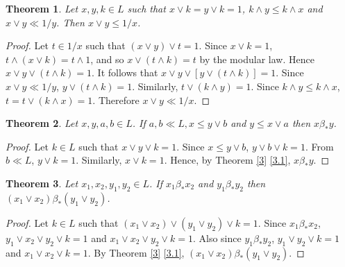 \documentclass[a4paper,12pt]{article}
\newtheorem{theorem}{Theorem}[section]
\numberwithin{equation}{section}
\begin{document}

\begin{theorem}\label{16}
  Let $ x,y,k \in L $ such that $ x \vee k = y \vee k = 1 $, $ k \wedge y \leq k \wedge x $ and $ x \vee y \ll 1/y $. 
  Then $ x \vee y \leq 1/x $.
\end{theorem}

\begin{proof}
  Let $ t \in 1/x $ such that $ ( x \vee y ) \vee t = 1 $. Since $ x \vee k = 1 $, $ t \wedge ( x \vee k ) = t \wedge 1 $, 
  and so $ x \vee ( t \wedge k ) = t $ by the modular law. Hence $ x \vee y \vee ( t \wedge k ) = 1 $. 
  It follows that $ x \vee y \vee \left[ y \vee ( t \wedge k ) \right] = 1 $. Since $ x \vee y \ll 1/y $, 
  $ y \vee ( t \wedge k ) = 1 $. Similarly, $ t \vee ( k \wedge y ) = 1 $. 
  Since $ k \wedge y \leq k \wedge x $, $ t = t \vee ( k \wedge x ) = 1 $. Therefore $ x \vee y \ll 1/x $.
\end{proof}

\begin{theorem}\label{17}
  Let $x,y,a,b \in L $. If $ a,b \ll L, x \leq y \vee b $ and $ y \leq x \vee a $ then $ x \beta_* y $.
\end{theorem}

\begin{proof}
  Let $ k \in L $ such that $ x \vee y \vee k = 1 $. Since $ x \leq y \vee b $, $ y \vee b \vee k = 1 $. 
  From $ b \ll L $, $ y \vee k = 1 $. Similarly, $ x \vee k = 1 $. 
  Hence, by Theorem \ref{3} \ref{3.1}, $ x \beta_* y $.
\end{proof}


\begin{theorem}\label{18}
  Let $ x_1,x_2,y_1,y_2 \in L $. If $ x_1 \beta_* x_2 $ and $ y_1 \beta_* y_2 $ then $ ( x_1 \vee x_2 ) \beta_* ( y_1 \vee y_2 ) $.
\end{theorem}

\begin{proof}
  Let $ k \in L $ such that $ (x_1 \vee x_2 ) \vee (y_1 \vee y_2 ) \vee k = 1 $. Since $ x_1 \beta_* x_2 $, 
  $ y_1 \vee x_2 \vee y_2 \vee k = 1 $ and $ x_1 \vee x_2 \vee y_2 \vee k = 1 $. Also since 
  $ y_1 \beta_* y_2 $, $ y_1 \vee y_2 \vee k = 1 $ and $ x_1 \vee x_2 \vee k = 1 $. 
  By Theorem \ref{3} \ref{3.1}, $ ( x_1 \vee x_2 ) \beta_* ( y_1 \vee y_2 ) $.
\end{proof}
\end{document}
